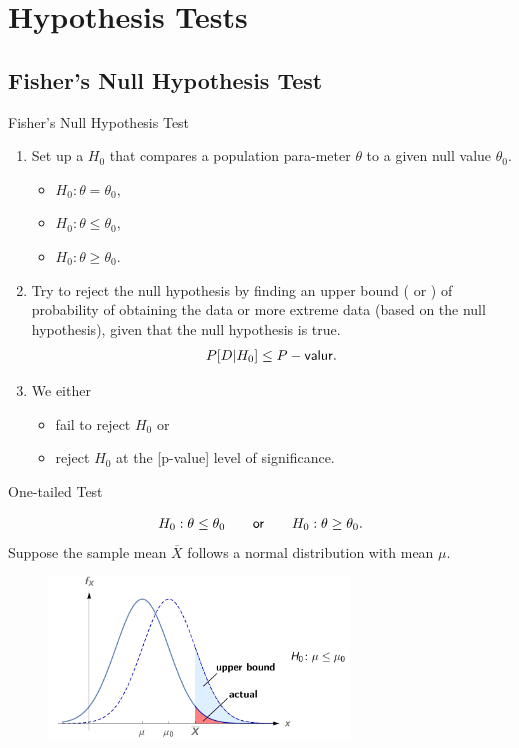 \section{Hypothesis Tests}

\subsection{Fisher's Null Hypothesis Test}

\begin{frame}{Fisher's Null Hypothesis Test}

\begin{enumerate}
	\justifying
	\item Set up a  $H_0$ that compares a population para-meter $\theta$ to a given null value $\theta_0$.
	\begin{itemize}
		\item $H_0: \theta = \theta_0$,
		\item $H_0: \theta \leq \theta_0$,
		\item $H_0: \theta \geq \theta_0$.
	\end{itemize}
	\item Try to reject the null hypothesis by finding an upper bound ( or ) of probability of obtaining the data or more extreme data (based on the null hypothesis), given that the null hypothesis is true.
	\begin{align*}
	P[D|H_0]\leq P-\mathsf{valur}.
	\end{align*}
	\item We either 
	\begin{itemize}
		\item fail to reject $H_0$ or
		\item reject $H_0$ at the [p-value] level of significance.
	\end{itemize}
\end{enumerate}

\end{frame}

\begin{frame}{One-tailed Test}

\justifying
{}
\begin{align*}
H_0: \theta \leq \theta_0 \qquad \mathsf{or} \qquad H_0: \theta \geq \theta_0.
\end{align*}
 Suppose the sample mean $\overline{X}$ follows a normal distribution with mean $\mu$.
\begin{figure}[htbp]
	\centering
	\includegraphics[width=8cm]{./images/rc5fig1.png}
\end{figure}

\end{frame}

